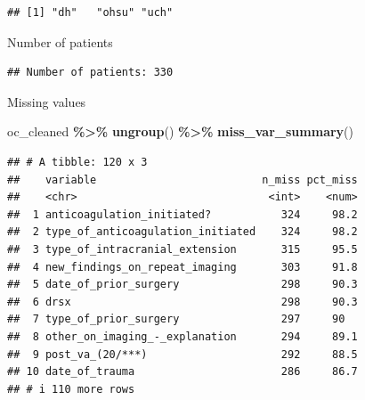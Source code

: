 \documentclass[
]{article}
\newenvironment{Shaded}{\begin{snugshade}}{\end{snugshade}}
\newcommand{\CommentTok}[1]{\textcolor[rgb]{0.56,0.35,0.01}{\textit{#1}}}
\newcommand{\FunctionTok}[1]{\textcolor[rgb]{0.13,0.29,0.53}{\textbf{#1}}}
\newcommand{\NormalTok}[1]{#1}
\newcommand{\SpecialCharTok}[1]{\textcolor[rgb]{0.81,0.36,0.00}{\textbf{#1}}}
\newcommand{\StringTok}[1]{\textcolor[rgb]{0.31,0.60,0.02}{#1}}
\begin{document}
\begin{Shaded}
\end{Shaded}

\begin{verbatim}
## [1] "dh"   "ohsu" "uch"
\end{verbatim}

Number of patients

\begin{Shaded}
\end{Shaded}

\begin{verbatim}
## Number of patients: 330
\end{verbatim}

Missing values

\begin{Shaded}
\begin{Highlighting}[]
\NormalTok{oc\_cleaned }\SpecialCharTok{\%\textgreater{}\%} \FunctionTok{ungroup}\NormalTok{() }\SpecialCharTok{\%\textgreater{}\%} \FunctionTok{miss\_var\_summary}\NormalTok{()}
\end{Highlighting}
\end{Shaded}

\begin{verbatim}
## # A tibble: 120 x 3
##    variable                          n_miss pct_miss
##    <chr>                              <int>    <num>
##  1 anticoagulation_initiated?           324     98.2
##  2 type_of_anticoagulation_initiated    324     98.2
##  3 type_of_intracranial_extension       315     95.5
##  4 new_findings_on_repeat_imaging       303     91.8
##  5 date_of_prior_surgery                298     90.3
##  6 drsx                                 298     90.3
##  7 type_of_prior_surgery                297     90  
##  8 other_on_imaging_-_explanation       294     89.1
##  9 post_va_(20/***)                     292     88.5
## 10 date_of_trauma                       286     86.7
## # i 110 more rows
\end{verbatim}
\end{document}
